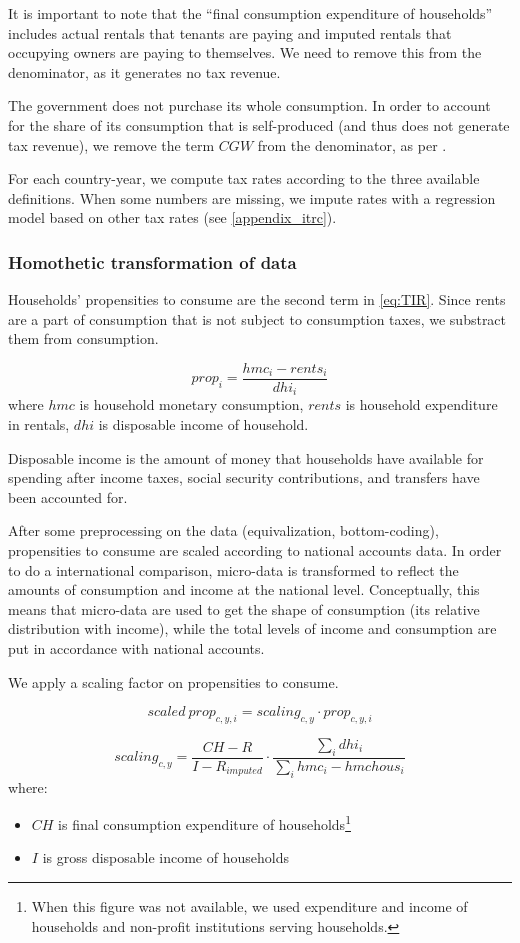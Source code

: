 \documentclass[12pt]{article}
\begin{document}
It is important to note that the ``final consumption expenditure of households'' includes actual rentals that tenants are paying and imputed rentals that occupying owners are paying to themselves. We need to remove this from the denominator, as it generates no tax revenue.

The government does not purchase its whole consumption. In order to account for the share of its consumption that is self-produced (and thus does not generate tax revenue), we remove the term $CGW$ from the denominator, as per \cite{mendoza1994effective}.

For each country-year, we compute tax rates according to the three available definitions. When some numbers are missing, we impute rates with a regression model based on other tax rates (see \cref{appendix_itrc}).


\subsubsection{Homothetic transformation of data}
\label{subsub:prop}
Households' propensities to consume are the second term in \cref{eq:TIR}. Since rents are a part of consumption that is not subject to consumption taxes, we substract them from consumption.

\[ prop_i = \frac{hmc_i-rents_i}{dhi_i} \]
where $hmc$ is household monetary consumption, $rents$ is household expenditure in rentals, $dhi$ is disposable income of household.

Disposable income is the amount of money that households have available for spending after income taxes, social security contributions, and transfers have been accounted for.

After some preprocessing on the data (equivalization, bottom-coding), propensities to consume are scaled according to national accounts data. In order to do a international comparison, micro-data is transformed to reflect the amounts of consumption and income at the national level. Conceptually, this means that micro-data are used to get the shape of consumption (its relative distribution with income), while the total levels of income and consumption are put in accordance with national accounts.

We apply a scaling factor on propensities to consume.

\[ scaled\ prop_{c,y,i} = scaling_{c,y} \cdot prop_{c,y,i} \]

\[ scaling_{c,y} = \frac{CH-R}{I-R_{imputed}} \cdot \frac{\sum_i dhi_i}{\sum_i hmc_i-hmchous_i } \]
where:
\begin{itemize}
\item $CH$ is final consumption expenditure of households\footnote{When this figure was not available, we used expenditure and income of households and non-profit institutions serving households.}
\item $I$ is gross disposable income of households
\end{itemize}
\end{document}
